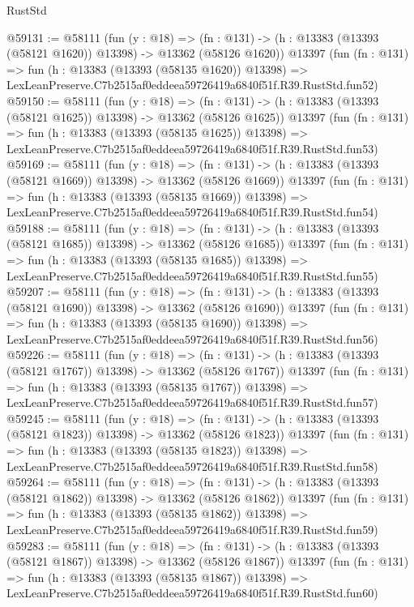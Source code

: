 \begin{lexlean}{RustStd}
\begin{coremodule}
@59131 := @58111
    (fun (y : @18) =>
    (fn : @131) -> (h : @13383 (@13393 (@58121 @1620)) @13398) -> @13362 (@58126 @1620))
    @13397
    (fun (fn : @131) =>
    fun (h : @13383 (@13393 (@58135 @1620)) @13398) =>
    LexLeanPreserve.C7b2515af0eddeea59726419a6840f51f.R39.RustStd.fun52)
@59150 := @58111
    (fun (y : @18) =>
    (fn : @131) -> (h : @13383 (@13393 (@58121 @1625)) @13398) -> @13362 (@58126 @1625))
    @13397
    (fun (fn : @131) =>
    fun (h : @13383 (@13393 (@58135 @1625)) @13398) =>
    LexLeanPreserve.C7b2515af0eddeea59726419a6840f51f.R39.RustStd.fun53)
@59169 := @58111
    (fun (y : @18) =>
    (fn : @131) -> (h : @13383 (@13393 (@58121 @1669)) @13398) -> @13362 (@58126 @1669))
    @13397
    (fun (fn : @131) =>
    fun (h : @13383 (@13393 (@58135 @1669)) @13398) =>
    LexLeanPreserve.C7b2515af0eddeea59726419a6840f51f.R39.RustStd.fun54)
@59188 := @58111
    (fun (y : @18) =>
    (fn : @131) -> (h : @13383 (@13393 (@58121 @1685)) @13398) -> @13362 (@58126 @1685))
    @13397
    (fun (fn : @131) =>
    fun (h : @13383 (@13393 (@58135 @1685)) @13398) =>
    LexLeanPreserve.C7b2515af0eddeea59726419a6840f51f.R39.RustStd.fun55)
@59207 := @58111
    (fun (y : @18) =>
    (fn : @131) -> (h : @13383 (@13393 (@58121 @1690)) @13398) -> @13362 (@58126 @1690))
    @13397
    (fun (fn : @131) =>
    fun (h : @13383 (@13393 (@58135 @1690)) @13398) =>
    LexLeanPreserve.C7b2515af0eddeea59726419a6840f51f.R39.RustStd.fun56)
@59226 := @58111
    (fun (y : @18) =>
    (fn : @131) -> (h : @13383 (@13393 (@58121 @1767)) @13398) -> @13362 (@58126 @1767))
    @13397
    (fun (fn : @131) =>
    fun (h : @13383 (@13393 (@58135 @1767)) @13398) =>
    LexLeanPreserve.C7b2515af0eddeea59726419a6840f51f.R39.RustStd.fun57)
@59245 := @58111
    (fun (y : @18) =>
    (fn : @131) -> (h : @13383 (@13393 (@58121 @1823)) @13398) -> @13362 (@58126 @1823))
    @13397
    (fun (fn : @131) =>
    fun (h : @13383 (@13393 (@58135 @1823)) @13398) =>
    LexLeanPreserve.C7b2515af0eddeea59726419a6840f51f.R39.RustStd.fun58)
@59264 := @58111
    (fun (y : @18) =>
    (fn : @131) -> (h : @13383 (@13393 (@58121 @1862)) @13398) -> @13362 (@58126 @1862))
    @13397
    (fun (fn : @131) =>
    fun (h : @13383 (@13393 (@58135 @1862)) @13398) =>
    LexLeanPreserve.C7b2515af0eddeea59726419a6840f51f.R39.RustStd.fun59)
@59283 := @58111
    (fun (y : @18) =>
    (fn : @131) -> (h : @13383 (@13393 (@58121 @1867)) @13398) -> @13362 (@58126 @1867))
    @13397
    (fun (fn : @131) =>
    fun (h : @13383 (@13393 (@58135 @1867)) @13398) =>
    LexLeanPreserve.C7b2515af0eddeea59726419a6840f51f.R39.RustStd.fun60)

\end{coremodule}
\end{lexlean}
